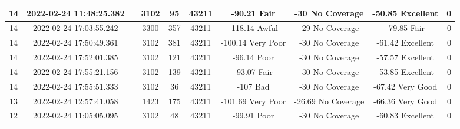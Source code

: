 \begin{longtable*}{|c|c|c|c|c|c|c|c|c|c|}
14&2022-02-24 11:48:25.382&&3102&95&43211& -90.21    Fair        & -30       No Coverage & -50.85    Excellent   & 0\\\hline
{}14&2022-02-24 17:03:55.242&&3300&357&43211& -118.14   Awful       & -29       No Coverage & -79.85    Fair        & 0\\\hline
{}14&2022-02-24 17:50:49.361&&3102&381&43211& -100.14   Very Poor   & -30       No Coverage & -61.42    Excellent   & 0\\\hline
{}14&2022-02-24 17:52:01.385&&3102&121&43211& -96.14    Poor        & -30       No Coverage & -57.57    Excellent   & 0\\\hline
{}14&2022-02-24 17:55:21.156&&3102&139&43211& -93.07    Fair        & -30       No Coverage & -53.85    Excellent   & 0\\\hline
{}14&2022-02-24 17:55:51.333&&3102&36&43211& -107      Bad         & -30       No Coverage & -67.42    Very Good   & 0\\\hline
{}13&2022-02-24 12:57:41.058&&1423&175&43211& -101.69   Very Poor   & -26.69    No Coverage & -66.36    Very Good   & 0\\\hline
{}12&2022-02-24 11:05:05.095&&3102&48&43211& -99.91    Poor        & -30       No Coverage & -60.83    Excellent   & 0\\\hline

\end{longtable*}
